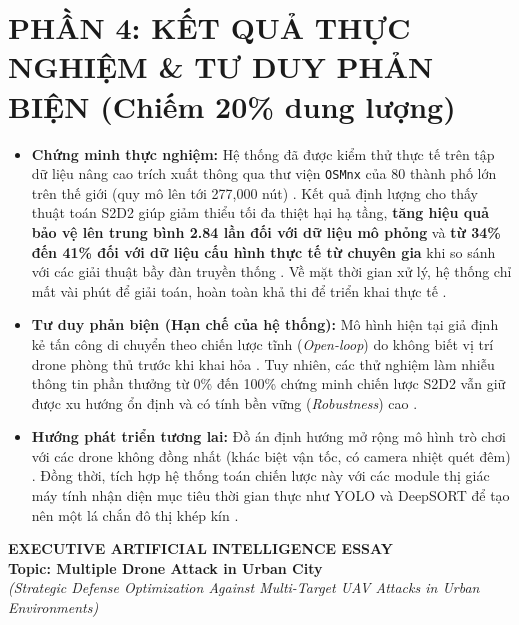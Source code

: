 \documentclass[11pt,a4paper]{article}
\begin{document}
\section{PHẦN 4: KẾT QUẢ THỰC NGHIỆM \& TƯ DUY PHẢN BIỆN (Chiếm 20\% dung lượng)}

\begin{itemize}
    \item \textbf{Chứng minh thực nghiệm:} Hệ thống đã được kiểm thử thực tế trên tập dữ liệu nâng cao trích xuất thông qua thư viện \texttt{OSMnx} \cite{boeing2017osmnx} của 80 thành phố lớn trên thế giới (quy mô lên tới 277,000 nút) \cite{mutzari2025defending}. Kết quả định lượng cho thấy thuật toán S2D2 giúp giảm thiểu tối đa thiệt hại hạ tầng, \textbf{tăng hiệu quả bảo vệ lên trung bình 2.84 lần đối với dữ liệu mô phỏng} và \textbf{từ 34\% đến 41\% đối với dữ liệu cấu hình thực tế từ chuyên gia} khi so sánh với các giải thuật bầy đàn truyền thống \cite{mutzari2025defending}. Về mặt thời gian xử lý, hệ thống chỉ mất vài phút để giải toán, hoàn toàn khả thi để triển khai thực tế \cite{mutzari2025defending}.
    \item \textbf{Tư duy phản biện (Hạn chế của hệ thống):} Mô hình hiện tại giả định kẻ tấn công di chuyển theo chiến lược tĩnh (\textit{Open-loop}) do không biết vị trí drone phòng thủ trước khi khai hỏa \cite{mutzari2025defending}. Tuy nhiên, các thử nghiệm làm nhiễu thông tin phần thưởng từ 0\% đến 100\% chứng minh chiến lược S2D2 vẫn giữ được xu hướng ổn định và có tính bền vững (\textit{Robustness}) cao \cite{mutzari2025defending}.
    \item \textbf{Hướng phát triển tương lai:} Đồ án định hướng mở rộng mô hình trò chơi với các drone không đồng nhất (khác biệt vận tốc, có camera nhiệt quét đêm) \cite{mutzari2025defending}. Đồng thời, tích hợp hệ thống toán chiến lược này với các module thị giác máy tính nhận diện mục tiêu thời gian thực như YOLO và DeepSORT để tạo nên một lá chắn đô thị khép kín \cite{mutzari2025defending}.
\end{itemize}


\newpage
{}

\begin{center}
    \textbf{\LARGE EXECUTIVE ARTIFICIAL INTELLIGENCE ESSAY} \\
    \vspace{0.2cm}
    \textbf{\large Topic: Multiple Drone Attack in Urban City} \\
    \textit{(Strategic Defense Optimization Against Multi-Target UAV Attacks in Urban Environments)}
\end{center}
\end{document}
